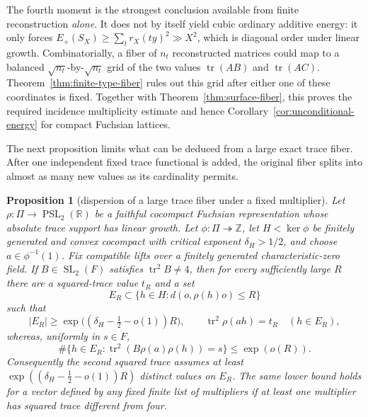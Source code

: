 \documentclass[11pt,reqno]{amsart}
\newtheorem{proposition}[theorem]{Proposition}
\theoremstyle{definition}
\theoremstyle{remark}
\newcommand{\R}{\mathbb R}
\newcommand{\Z}{\mathbb Z}
\newcommand{\Tr}{\operatorname{tr}}
\newcommand{\SL}{\operatorname{SL}}
\newcommand{\PSL}{\operatorname{PSL}}
\begin{document}
The fourth moment is the strongest conclusion available from finite
reconstruction \emph{alone}.  It does not by itself yield cubic ordinary
additive energy: it only forces
\(E_+(S_X)\ge\sum_t r_X(ty)^2\gg X^2\), which is diagonal order under linear
growth.  Combinatorially, a fiber of \(n_t\) reconstructed matrices could map
to a balanced \(\sqrt{n_t}\)-by-\(\sqrt{n_t}\) grid of the two values
\(\Tr(AB)\) and \(\Tr(AC)\).
Theorem~\ref{thm:finite-type-fiber} rules out this grid after either one of
these coordinates is fixed.  Together with
Theorem~\ref{thm:surface-fiber}, this proves the required incidence
multiplicity estimate and hence Corollary~\ref{cor:unconditional-energy} for
compact Fuchsian lattices.

The next proposition limits what can be deduced from a large exact trace
fiber.  After one independent fixed trace functional is added, the original
fiber splits into almost as many new values as its cardinality permits.

\begin{proposition}[dispersion of a large trace fiber under a fixed multiplier]
\label{prop:fixed-multiplier-dispersion}
Let \(\rho\colon\Pi\to\PSL_2(\R)\) be a faithful cocompact Fuchsian
representation whose absolute trace support has linear growth.  Let
\(\phi\colon\Pi\twoheadrightarrow\Z\), let \(H<\ker\phi\) be finitely
generated and convex cocompact with critical exponent \(\delta_H>1/2\), and
choose \(a\in\phi^{-1}(1)\).  Fix compatible lifts over a finitely generated
characteristic-zero field.  If \(B\in\SL_2(F)\) satisfies
\(\Tr^2B\ne4\), then for every sufficiently large \(R\) there are a
squared-trace value \(t_R\) and a set
\[
 E_R\subset\{h\in H:d(o,\rho(h)o)\le R\}
\]
such that
\[
 |E_R|\ge
 \exp\bigl((\delta_H-\tfrac12-o(1))R\bigr),
 \qquad
 \Tr^2\rho(ah)=t_R\quad(h\in E_R),
\]
whereas, uniformly in \(s\in F\),
\[
 \#\{h\in E_R:\Tr^2(B\rho(a)\rho(h))=s\}\le\exp(o(R)).
\]
Consequently the second squared trace assumes at least
\(\exp((\delta_H-\tfrac12-o(1))R)\) distinct values on \(E_R\).
The same lower bound holds for a vector defined by any fixed finite list of
multipliers if at least one multiplier has squared trace different from four.
\end{proposition}
\end{document}
